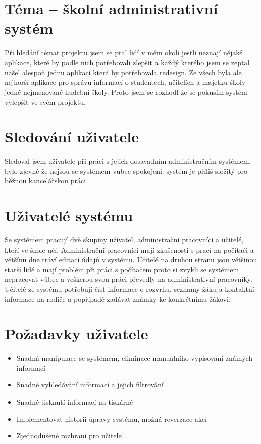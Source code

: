 \documentclass[a4paper, 11pt, twocolumn]{article}
\begin{document}
	\section*{\large{Téma -- školní administrativní systém}}
	\vspace*{-0.2cm}
 	Při hledání témat projektu jsem se ptal lidí v mém okolí jestli neznají nějaké aplikace, které by podle nich potřebovali zlepšit a každý kterého jsem se zeptal 
	našel alespoň jednu aplikaci která by potřebovala redesign. Ze všech byla ale nejhorší aplikace pro správu informací o studentech, učitelích a majetku školy 
	jedné nejmenované hudební školy. Proto jsem se rozhodl že se pokusím systém vylepšit ve svém projektu.
	
	\section*{\large{Sledování uživatele}}
	\vspace*{-0.2cm}
	Sledoval jsem uživatele při práci s jejich dosavadním administračním systémem, bylo zjevné že nejsou se systémem vůbec spokojeni. systém je příliš složitý 
	pro běžnou kancelářskou práci.

	\section*{\large{Uživatelé systému}}
	\vspace*{-0.2cm}
	Se systémem pracují dvě skupiny uživatel, administrační pracovníci a učitelé, kteří ve škole učí. Administrační pracovníci mají zkušenosti s prací na počítači a 
	většínu dne tráví editací údajů v systému. Učitelé na druhou stranu jsou většinou starší lidé a mají problém při práci s počítačem proto si zvykli se systémem 
	nepracovat vůbec a veškerou svou práci převedly na administrativní pracovníky. Učitelé ze systému potřebují číst informace o rozvrhu, seznamy žáku a 
	kontaktní informace na rodiče a popřípadě zadávat známky ke konkrétnímu žákovi.

	\section*{\large{Požadavky uživatele}}
	\vspace*{-0.2cm}
	\begin{itemize}
		\item Snadná manipulace se systémem, eliminace manuálního vypisování známých informací
		\vspace{-0.2cm}
		\item Snadné vyhledávání informací a jejich filtrování
		\vspace{-0.2cm}
		\item Snadné tisknutí informací na tiskárně
		\vspace{-0.2cm}
		\item Implementovat historii úpravy systému, možná reverzace akcí
		\vspace{-0.2cm}
		\item Zjednodušené rozhraní pro učitele
	\end{itemize}
\end{document}
